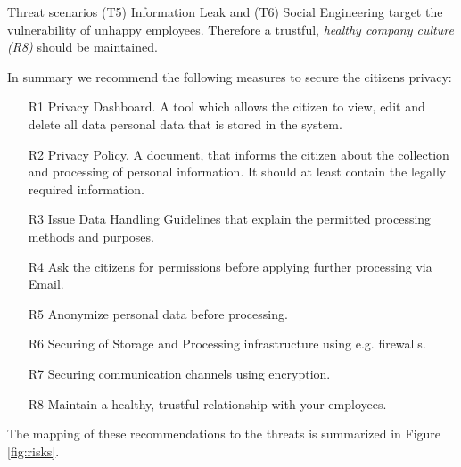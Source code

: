 Threat scenarios (T5) Information Leak and (T6) Social Engineering
target the vulnerability of unhappy employees. Therefore a trustful,
\emph{healthy company culture (R8)} should be maintained.

In summary we recommend the following measures to secure the citizens
privacy:
\begin{enumerate}
\item[R1] Privacy Dashboard. A tool which allows the citizen to view, edit
  and delete all data personal data that is stored in the system.
\item[R2] Privacy Policy. A document, that informs the citizen about the
  collection and processing of personal information. It should at
  least contain the legally required information.
\item[R3] Issue Data Handling Guidelines that explain the permitted
  processing methods and purposes.
\item[R4] Ask the citizens for permissions before applying further
  processing via Email.
\item[R5] Anonymize personal data before processing.
\item[R6] Securing of Storage and Processing infrastructure using e.g. firewalls.
\item[R7] Securing communication channels using encryption.
\item[R8] Maintain a healthy, trustful relationship with your employees.
\end{enumerate}
The mapping of these recommendations to the threats is summarized in Figure \ref{fig:risks}.
